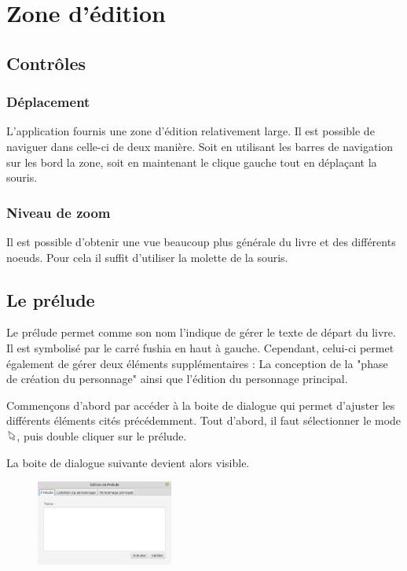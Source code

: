 \chapter{Zone d'édition}

	\section{Contrôles}

		\subsection{Déplacement}

			L'application fournis une zone d'édition relativement large. Il est possible de naviguer dans celle-ci de deux manière. Soit en utilisant les barres de navigation sur les bord la zone, soit en maintenant le clique gauche tout en déplaçant la souris.

		\subsection{Niveau de zoom}

			Il est possible d'obtenir une vue beaucoup plus générale du livre et des différents noeuds. Pour cela il suffit d'utiliser la molette de la souris.

	\section{Le prélude}

        Le prélude permet comme son nom l'indique de gérer le texte de départ du livre. Il est symbolisé par le carré fushia en haut à gauche. Cependant, celui-ci permet également de gérer deux éléments supplémentaires : La conception de la "phase de création du personnage" ainsi que l'édition du personnage principal.

		Commençons d'abord par accéder à la boite de dialogue qui permet d'ajuster les différents éléments cités précédemment. Tout d'abord, il faut sélectionner le mode \includegraphics[height=10pt, keepaspectratio]{img/icons/select.png}, puis double cliquer sur le prélude.

		La boite de dialogue suivante devient alors visible.

		\begin{figure}[H]
			\centering\includegraphics[width=0.4\textwidth, keepaspectratio]{img/prelude.png}
		\end{figure}

